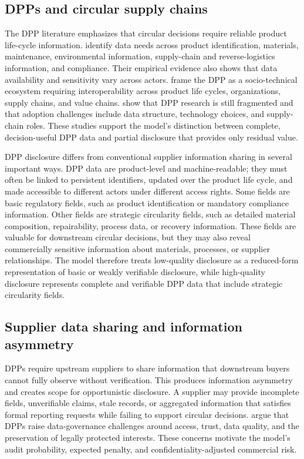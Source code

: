 \documentclass[final,5p,times,authoryear]{elsarticle}
\begin{document}
\subsection{DPPs and circular supply chains}

The DPP literature emphasizes that circular decisions require reliable product life-cycle information. \citet{jensen2023digital} identify data needs across product identification, materials, maintenance, environmental information, supply-chain and reverse-logistics information, and compliance. Their empirical evidence also shows that data availability and sensitivity vary across actors. \citet{king2023proposed} frame the DPP as a socio-technical ecosystem requiring interoperability across product life cycles, organizations, supply chains, and value chains. \citet{lopes2024digital} show that DPP research is still fragmented and that adoption challenges include data structure, technology choices, and supply-chain roles. These studies support the model's distinction between complete, decision-useful DPP data and partial disclosure that provides only residual value.

DPP disclosure differs from conventional supplier information sharing in several important ways. DPP data are product-level and machine-readable; they must often be linked to persistent identifiers, updated over the product life cycle, and made accessible to different actors under different access rights. Some fields are basic regulatory fields, such as product identification or mandatory compliance information. Other fields are strategic circularity fields, such as detailed material composition, repairability, process data, or recovery information. These fields are valuable for downstream circular decisions, but they may also reveal commercially sensitive information about materials, processes, or supplier relationships. The model therefore treats low-quality disclosure as a reduced-form representation of basic or weakly verifiable disclosure, while high-quality disclosure represents complete and verifiable DPP data that include strategic circularity fields.

\subsection{Supplier data sharing and information asymmetry}

DPPs require upstream suppliers to share information that downstream buyers cannot fully observe without verification. This produces information asymmetry and creates scope for opportunistic disclosure. A supplier may provide incomplete fields, unverifiable claims, stale records, or aggregated information that satisfies formal reporting requests while failing to support circular decisions. \citet{ducuing2023data} argue that DPPs raise data-governance challenges around access, trust, data quality, and the preservation of legally protected interests. These concerns motivate the model's audit probability, expected penalty, and confidentiality-adjusted commercial risk.
\end{document}

